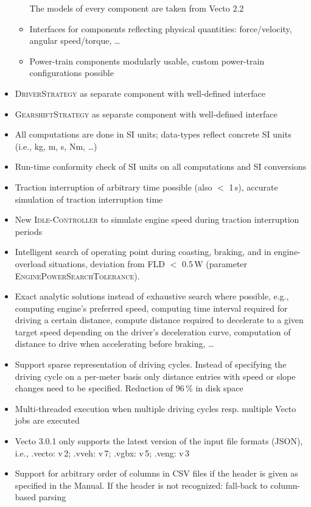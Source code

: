 \begin{itemize}
\begin{itemize}
		The models of every component are taken from Vecto 2.2
		\item Interfaces for components reflecting physical quantities:
		force/velocity, angular speed/torque, \ldots
		\item Power-train components modularly usable, custom power-train configurations possible
	\end{itemize}
	\item \textsc{DriverStrategy} as separate component with well-defined interface
	\item \textsc{GearshiftStrategy} as separate component with well-defined interface
	\item All computations are done in SI units; data-types reflect concrete SI units (i.e., kg, m, s, Nm, \ldots)
	\item Run-time conformity check of SI units on all computations and SI conversions
	\item Traction interruption of arbitrary time possible (also $<$ 1\,s), accurate simulation of traction interruption time
	\item New \textsc{Idle-Controller} to simulate engine speed during traction interruption periods
	\item Intelligent search of operating point during coasting, braking, and in engine-overload situations, deviation from FLD $<$ 0.5\,W (parameter \textsc{EnginePowerSearchTolerance}).
	\item Exact analytic solutions instead of exhaustive search where possible, e.g., computing engine's preferred speed, computing time interval required for driving a certain distance, compute distance required to decelerate to a given target speed depending on the driver's deceleration curve, computation of distance to drive when accelerating before braking, \ldots
	\item Support sparse representation of driving cycles. Instead of specifying the driving cycle on a per-meter basis only distance entries with speed or slope changes need to be specified. Reduction of 96\,\% in disk space
	\item Multi-threaded execution when multiple driving cycles resp. multiple Vecto jobs are executed
	\item Vecto 3.0.1 only supports the latest version of the input file formats (JSON), i.e., .vecto: v\,2; .vveh: v\,7; .vgbx: v\,5; .veng: v\,3
	\item Support for arbitrary order of columns in CSV files if the header is given as specified in the Manual. If the header is not recognized: fall-back to column-based parsing

\end{itemize}
